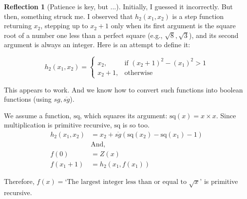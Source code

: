 \documentclass[11pt]{book}
\theoremstyle{definition}
\theoremstyle{plain}
\theoremstyle{problemstyle}
\theoremstyle{remark}
\theoremstyle{definition}
\newtheorem{reflection}{Reflection}
\begin{document}
\begin{reflection}[Patience is key, but ...]
    Initially, I guessed it incorrectly. But then, something struck me. I observed that $h_2(x_1,x_2)$ is a step function returning $x_2$, stepping up to $x_2+1$ only when its first argument is the square root of a number one less than a perfect square (e.g., $\sqrt{8},\sqrt{3}$), and its second argument is always an integer. Here is an attempt to define it:
     
    \begin{equation}
        \label{eq:floor-sqrt-x-1}
        h_2(x_1,x_2)=\begin{cases}
            x_2, & \text{if $(x_2+1)^2-(x_1)^2>1$}\\
            x_2+1, & \text{otherwise}
		 \end{cases}
    \end{equation}

    This appears to work. And we know how to convert such functions into boolean functions (using $sg,\overline{sg}$).
\end{reflection}

We assume a function, $\text{sq}$, which squares its argument: $\text{sq}(x)=x\times x$. Since multiplication is primitive recursive, $\text{sq}$ is so too.
    \begin{equation}
        \label{eq:floor-sqrt-x-2}
        \begin{aligned}
            h_2(x_1,x_2)&=x_2+\overline{sg}(\text{sq}(x_2)-\text{sq}(x_1)-1)\\
            &\text{And,}\\
            f(0)&=Z(x)\\
            f(x_1+1)&=h_2(x_1,f(x_1))
        \end{aligned}
    \end{equation}

Therefore, $f(x)=\text{`The largest integer less than or equal to $\sqrt{x}$'}$ is primitive recursive.
\end{document}
